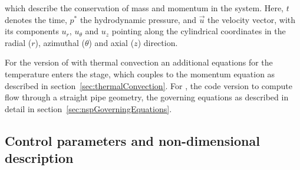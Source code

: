 \documentclass[a4paper, 11pt, DIV=11]{scrartcl}
\begin{document}
which describe the conservation of mass and momentum in the system. Here, $t$
denotes the time, $p^{\ast}$ the hydrodynamic pressure, and $\vec{u}$ the velocity
vector, with its components $u_{r}$, $u_{\theta}$ and $u_{z}$ pointing along the
cylindrical coordinates in the radial ($r$), azimuthal ($\theta$) and axial ($z$)
direction.
\par
For the version of \nsc with thermal convection an additional equations for the
temperature enters the stage, which couples to the momentum equation as described
in section~\ref{sec:thermalConvection}. For \nsp, the code version to compute flow
through a straight pipe geometry, the governing equations as described in detail
in section~\ref{sec:nspGoverningEquations}.

\subsection{Control parameters and non-dimensional description}
\label{sec:controlParameters}
\end{document}
